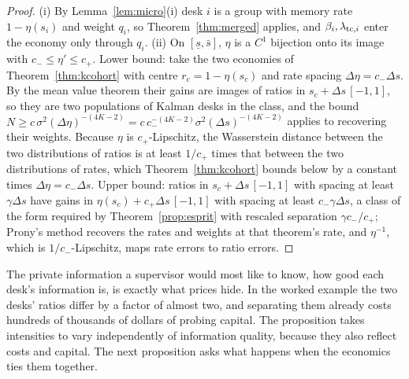 \documentclass[12pt]{article}
\theoremstyle{definition}
\theoremstyle{remark}
\begin{document}
\begin{proof}
(i) By Lemma~\ref{lem:micro}(i) desk $i$ is a group with memory rate $1-\eta(s_i)$ and weight $q_i$, so Theorem~\ref{thm:merged} applies, and $\beta_i,\lambda_{{\rm tc},i}$ enter the economy only through $q_i$. (ii) On $[\underline s,\bar s]$, $\eta$ is a $C^1$ bijection onto its image with $c_-\le\eta'\le c_+$. Lower bound: take the two economies of Theorem~\ref{thm:kcohort} with centre $r_c=1-\eta(s_c)$ and rate spacing $\Delta\eta=c_-\Delta s$. By the mean value theorem their gains are images of ratios in $s_c+\Delta s\,[-1,1]$, so they are two populations of Kalman desks in the class, and the bound $N\ge c\,\sigma^2(\Delta\eta)^{-(4K-2)}=c\,c_-^{-(4K-2)}\sigma^2(\Delta s)^{-(4K-2)}$ applies to recovering their weights. Because $\eta$ is $c_+$-Lipschitz, the Wasserstein distance between the two distributions of ratios is at least $1/c_+$ times that between the two distributions of rates, which Theorem~\ref{thm:kcohort} bounds below by a constant times $\Delta\eta=c_-\Delta s$. Upper bound: ratios in $s_c+\Delta s\,[-1,1]$ with spacing at least $\gamma\Delta s$ have gains in $\eta(s_c)+c_+\Delta s\,[-1,1]$ with spacing at least $c_-\gamma\Delta s$, a class of the form required by Theorem~\ref{prop:esprit} with rescaled separation $\gamma c_-/c_+$; Prony's method recovers the rates and weights at that theorem's rate, and $\eta^{-1}$, which is $1/c_-$-Lipschitz, maps rate errors to ratio errors.
\end{proof}

The private information a supervisor would most like to know, how good each desk's information is, is exactly what prices hide. In the worked example the two desks' ratios differ by a factor of almost two, and separating them already costs hundreds of thousands of dollars of probing capital. The proposition takes intensities to vary independently of information quality, because they also reflect costs and capital. The next proposition asks what happens when the economics ties them together.
\end{document}
